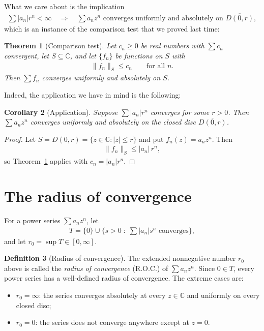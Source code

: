 \documentclass[11pt]{article}
\theoremstyle{plain}
\newtheorem{theorem}{Theorem}[section]
\newtheorem{corollary}[theorem]{Corollary}
\theoremstyle{definition}
\newtheorem{definition}[theorem]{Definition}
\theoremstyle{remark}
\numberwithin{equation}{section}
\newcommand{\be}{\begin{eqnarray}}
\newcommand{\ee}{\end{eqnarray}}
\newcommand{\C}{\mathbb{C}}
\begin{document}
What we care about is the implication
\be
 \sum |a_n|r^n<\infty
 \quad\Longrightarrow\quad
 \sum a_nz^n\text{ converges uniformly and absolutely on }
 \overline{D(0,r)},
\ee
which is an instance of the comparison test that we proved last time:


\begin{theorem}[Comparison test]
\label{thm:comparison}
Let $c_n\ge0$ be real numbers with $\sum c_n$ convergent, let $S\subseteq\C$,
and let $\{f_n\}$ be functions on $S$ with
\be
 \|f_n\|_S\le c_n\qquad\text{for all }n.
\ee
Then $\sum f_n$ converges uniformly and absolutely on $S$.
\end{theorem}
%

Indeed, the application we have in mind is the following:

\begin{corollary}[Application]
\label{cor:closed-disc}
Suppose $\sum|a_n|r^n$ converges for some $r>0$. Then $\sum a_nz^n$
converges uniformly and absolutely on the \emph{closed} disc
$\overline{D(0,r)}$.
\end{corollary}

\begin{proof}
Let $S=\overline{D(0,r)}=\{z\in\C:|z|\le r\}$ and put $f_n(z)=a_nz^n$. Then
\be
 \|f_n\|_S\le|a_n|\,r^n,
\ee
so Theorem~\ref{thm:comparison} applies with $c_n=|a_n|r^n$.
\end{proof}

\section{The radius of convergence}

For a power series $\sum a_nz^n$, let
\be
 T=\{0\}\cup
 \{s>0 \;:\; \textstyle\sum|a_n|s^n\text{ converges}\},
\ee
and let $r_0=\sup T\in[0,\infty]$.

\begin{definition}[Radius of convergence]
The extended nonnegative number $r_0$ above is called the \emph{radius of
convergence} (R.O.C.) of $\sum a_nz^n$. Since $0\in T$, every power series
has a well-defined radius of convergence. The extreme cases are:
\begin{itemize}
\item $r_0=\infty$: the series converges absolutely at every $z\in\C$ and
uniformly on every closed disc;
\item $r_0=0$: the series does not converge anywhere except at $z=0$.
\end{itemize}
\end{definition}
\end{document}
